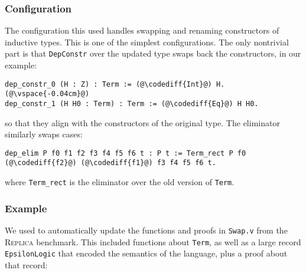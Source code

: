 \subsubsection{Configuration}

The configuration this used handles swapping and renaming constructors of inductive types.
This is one of the simplest configurations.
The only nontrivial part is that \lstinline{DepConstr} over the updated type swaps back the constructors, in our example:

\begin{lstlisting}[backgroundcolor=\color{cyan!30}]
dep_constr_0 (H : Z) : Term := (@\codediff{Int}@) H.(@\vspace{-0.04cm}@)
dep_constr_1 (H H0 : Term) : Term := (@\codediff{Eq}@) H H0.
\end{lstlisting}
so that they align with the constructors of the original type.
The eliminator similarly swaps cases:

\begin{lstlisting}[backgroundcolor=\color{cyan!30}]
dep_elim P f0 f1 f2 f3 f4 f5 f6 t : P t := Term_rect P f0 (@\codediff{f2}@) (@\codediff{f1}@) f3 f4 f5 f6 t.
\end{lstlisting}
where \lstinline{Term_rect} is the eliminator over the old version of \lstinline{Term}.


\subsubsection{Example}

We used \toolname to automatically update the functions and proofs in \lstinline{Swap.v} from the \textsc{Replica} benchmark.
This included functions about \lstinline{Term}, as well as a large record \lstinline{EpsilonLogic} that encoded the semantics of the language,
plus a proof about that record:


